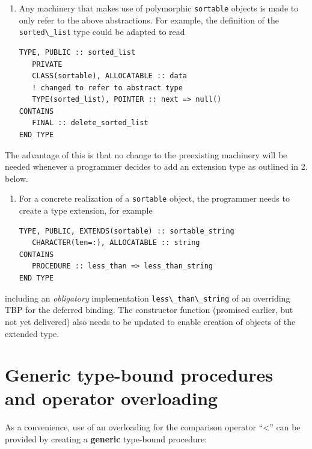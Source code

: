 \documentclass[
  paper=a4,
  ,captions=tableheading
]{scrartcl}
\newcommand{\passthrough}[1]{#1}
\begin{document}
\begin{enumerate}
\def\labelenumi{\arabic{enumi}.}
\item
  Any machinery that makes use of polymorphic
  \passthrough{\lstinline!sortable!} objects is made to only refer to
  the above abstractions. For example, the definition of the
  \passthrough{\lstinline!sorted\_list!} type could be adapted to read

\begin{lstlisting}
TYPE, PUBLIC :: sorted_list
   PRIVATE
   CLASS(sortable), ALLOCATABLE :: data
   ! changed to refer to abstract type
   TYPE(sorted_list), POINTER :: next => null()
CONTAINS
   FINAL :: delete_sorted_list
END TYPE
\end{lstlisting}
\end{enumerate}

The advantage of this is that no change to the preexisting machinery
will be needed whenever a programmer decides to add an extension type as
outlined in 2. below.

\begin{enumerate}
\def\labelenumi{\arabic{enumi}.}
\setcounter{enumi}{1}
\item
  For a concrete realization of a \passthrough{\lstinline!sortable!}
  object, the programmer needs to create a type extension, for example

\begin{lstlisting}
TYPE, PUBLIC, EXTENDS(sortable) :: sortable_string
   CHARACTER(len=:), ALLOCATABLE :: string
CONTAINS
   PROCEDURE :: less_than => less_than_string
END TYPE
\end{lstlisting}
\end{enumerate}

including an \emph{obligatory} implementation
\passthrough{\lstinline!less\_than\_string!} of an overriding TBP for
the deferred binding. The constructor function (promised earlier, but
not yet delivered) also needs to be updated to enable creation of
objects of the extended type.

\section{Generic type-bound procedures and operator
overloading}\label{generic-type-bound-procedures-and-operator-overloading}

As a convenience, use of an overloading for the comparison operator
``\textless{}'' can be provided by creating a \textbf{generic}
type-bound procedure:
\end{document}
